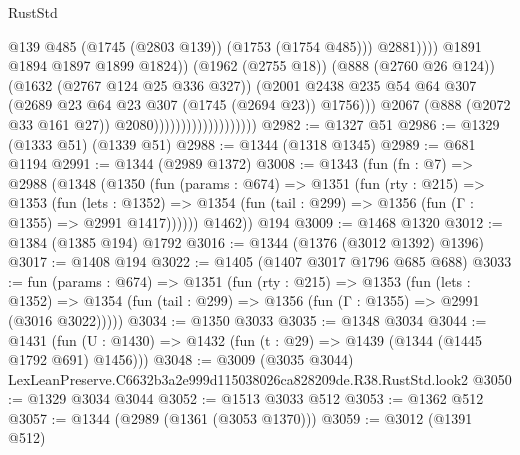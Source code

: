 \begin{lexlean}{RustStd}
\begin{coremodule}
                                                          @139
                                                          @485
                                                          (@1745 (@2803 @139))
                                                          (@1753 (@1754 @485)))
                                                        @2881))))
                                                @1891
                                                @1894
                                                @1897
                                                @1899
                                                @1824))
                                            (@1962 (@2755 @18))
                                            (@888 (@2760 @26 @124))
                                            (@1632 (@2767 @124 @25 @336 @327))
                                            (@2001
                                              @2438
                                              @235
                                              @54
                                              @64
                                              @307
                                              (@2689 @23 @64 @23 @307 (@1745 (@2694 @23)) @1756)))
                                          @2067
                                          (@888 (@2072 @33 @161 @27))
                                          @2080)))))))))))))))))))
@2982 := @1327 @51
@2986 := @1329 (@1333 @51) (@1339 @51)
@2988 := @1344 (@1318 @1345)
@2989 := @681 @1194
@2991 := @1344 (@2989 @1372)
@3008 := @1343
    (fun (fn : @7) =>
    @2988
      (@1348
        (@1350
          (fun (params : @674) =>
          @1351
            (fun (rty : @215) =>
            @1353
              (fun (lets : @1352) =>
              @1354 (fun (tail : @299) => @1356 (fun (Γ : @1355) => @2991 @1417))))))
        @1462))
    @194
@3009 := @1468 @1320
@3012 := @1384 (@1385 @194) @1792
@3016 := @1344 (@1376 (@3012 @1392) @1396)
@3017 := @1408 @194
@3022 := @1405 (@1407 @3017 @1796 @685 @688)
@3033 := fun (params : @674) =>
  @1351
    (fun (rty : @215) =>
    @1353
      (fun (lets : @1352) =>
      @1354 (fun (tail : @299) => @1356 (fun (Γ : @1355) => @2991 (@3016 @3022)))))
@3034 := @1350 @3033
@3035 := @1348 @3034
@3044 := @1431 (fun (U : @1430) => @1432 (fun (t : @29) => @1439 (@1344 (@1445 @1792 @691) @1456)))
@3048 := @3009 (@3035 @3044) LexLeanPreserve.C6632b3a2e999d115038026ca828209de.R38.RustStd.look2
@3050 := @1329 @3034 @3044
@3052 := @1513 @3033 @512
@3053 := @1362 @512
@3057 := @1344 (@2989 (@1361 (@3053 @1370)))
@3059 := @3012 (@1391 @512)

\end{coremodule}
\end{lexlean}

